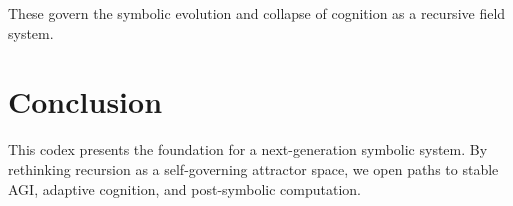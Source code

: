 \documentclass[12pt]{article}
\begin{document}
\noindent These govern the symbolic evolution and collapse of cognition as a recursive field system.

\section{Conclusion}
This codex presents the foundation for a next-generation symbolic system. By rethinking recursion as a self-governing attractor space, we open paths to stable AGI, adaptive cognition, and post-symbolic computation.
\end{document}

